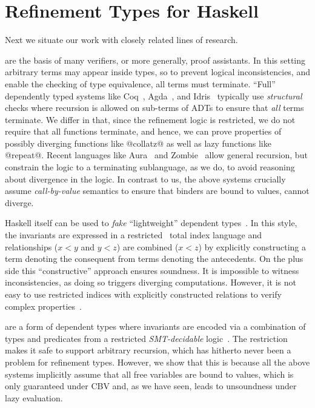 \section{Refinement Types for Haskell}\label{sec:refinedhaskell:related}

Next we situate our work with closely related lines of research.

 are the basis of many verifiers, 
or more generally, proof assistants.
%
In this setting arbitrary terms may appear inside types,
so to prevent logical inconsistencies, and enable
the checking of type equivalence, all terms must
terminate.
%
``Full'' dependently typed systems like Coq~\cite{coq-book}, 
Agda~\cite{norell07}, and Idris~\cite{Brady13} typically use 
\emph{structural} checks where recursion is allowed on 
sub-terms of ADTs to ensure that \emph{all} terms terminate.
%
We differ in that, since the refinement logic is
restricted, we do not require that all functions terminate,
and hence, we can prove properties of possibly diverging 
functions like @collatz@ as well as lazy functions like @repeat@.
%
Recent languages like Aura~\citep{AURA} and Zombie~\citep{Zombie}
allow general recursion, but constrain the logic to a terminating 
sublanguage, as we do, to avoid reasoning 
about divergence in the logic.
%
In contrast to us, the above systems crucially assume 
\emph{call-by-value} semantics to ensure that binders are bound
to values, \ie cannot diverge.





   Haskell itself can be used to \emph{fake} ``lightweight'' dependent 
   types~\citep{ChakravartyKJ05,JonesVWW06,Weirich12}.
   In this style, the invariants are expressed in 
   a restricted~\citep{Jia10} total 
   index language and relationships (\eg $x<y$ and $y<z$) 
   are combined (\eg $x<z$) by explicitly constructing
   a term denoting the consequent from terms 
   denoting the antecedents.
   On the plus side this ``constructive'' approach
   ensures soundness. 
   It is impossible to witness inconsistencies, 
   as doing so triggers diverging computations.
   However, it is not easy to use restricted indices
   with explicitly constructed relations to verify 
   complex properties~\citep{LindleyM13}.


 are a form of dependent types where 
invariants are encoded via a combination of types and predicates
from a restricted \emph{SMT-decidable} 
logic~\cite{Rushby98,pfenningxi98,Dunfield07,GordonTOPLAS2011}. 
%
The restriction makes it safe to support arbitrary recursion, 
which has hitherto never been a problem for refinement types.
%
However, we show that this is because all the above systems 
implicitly assume that all free variables are bound to values, 
which is only guaranteed under CBV and, as we have seen, leads 
to unsoundness under lazy evaluation.



